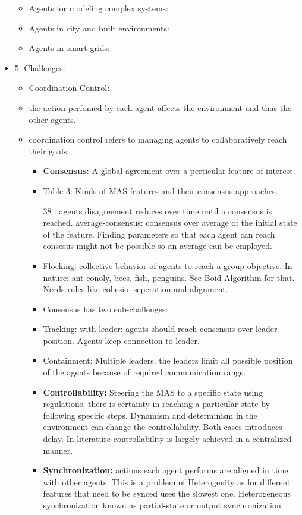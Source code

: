 \begin{itemize}[noitemsep,nolistsep]
\begin{itemize}[noitemsep,nolistsep]
		\item Agents for modeling complex systems:
		\item Agents in city and built environments:
		\item Agents in smart grids:
	\end{itemize}
	\item 5. Challenges:
	\begin{itemize}[noitemsep,nolistsep]
		\item Coordination Control:
		\item the action perfomed by each agent affects the environment and thus the other agents.
		\item coordination control refers to managing agents to collaboratively reach their goals.
		\begin{itemize}[noitemsep,nolistsep]
			\item \textbf{Consensus:} A global agreement over a perticular feature of interest.
			\item Table 3: Kinds of MAS features and their consensus approaches.
			\item [38]: agents disagreement reduces over time until a consensus is reached. average-consensus: consensus over average of the initial state of the feature. Finding parameters so that each agent can reach consesus might not be possible so an average can be employed.
			\item Flocking: collective behavior of agents to reach a group objective. In nature: ant conoly, bees, fish, penguins. See Boid Algorithm for that. Needs rules like cohesio, seperation and alignment.
			\item Consensus has two sub-challenges:
			\item Tracking: with leader: agents should reach consensus over leader position. Agents keep connection to leader.
			\item Containment: Multiple leaders. the leaders limit all possible position of the agents because of required communication range.
			\item \textbf{Controllability:} Steering the MAS to a specific state using regulations. there is certainty in reaching a particular state by following specific steps. Dynamism and determinism in the environment can change the controllability. Both cases introduces delay. In literature controllability is largely achieved in a centralized manner. 
			\item \textbf{Synchronization:} actions each agent performs are aligned in time with other agents. This is a problem of Heterogenity as for different features that need to be synced uses the slowest one. Heterogeneous synchronization known as partial-state or output synchronization.

\end{itemize}
\end{itemize}
\end{itemize}
